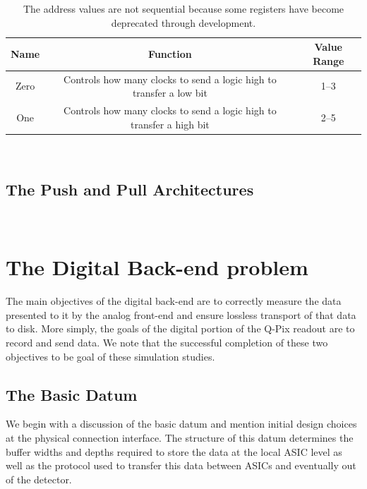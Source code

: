 \begin{table}
\begin{center}
\begin{tabular}{||c c c||}
 \hline
 Name & Function & Value Range\\ [0.5ex]
 \hline\hline
  Zero & Controls how many clocks to send a logic high to transfer a low bit & 1--3 \\
 \hline
  One & Controls how many clocks to send a logic high to transfer a high bit & 2--5 \\
 \hline
\end{tabular}
\caption{The address values are not sequential because some registers have become deprecated through development.}
\end{center}
\end{table}
~\label{table:endeavor_bits}

\subsection{The Push and Pull Architectures}~\label{sec:architectures}


\section{The Digital Back-end problem}

The main objectives of the digital back-end are to correctly measure the data presented to it by the analog front-end and ensure lossless transport of that data to disk.
More simply, the goals of the digital portion of the Q-Pix readout are to record and send data.
We note that the successful completion of these two objectives to be goal of these simulation studies.

\subsection{The Basic Datum}

We begin with a discussion of the basic datum and mention initial design choices at the physical connection interface.
The structure of this datum determines the buffer widths and depths required to store the data at the local ASIC level as well as the protocol used to transfer this data between ASICs and eventually out of the detector.


